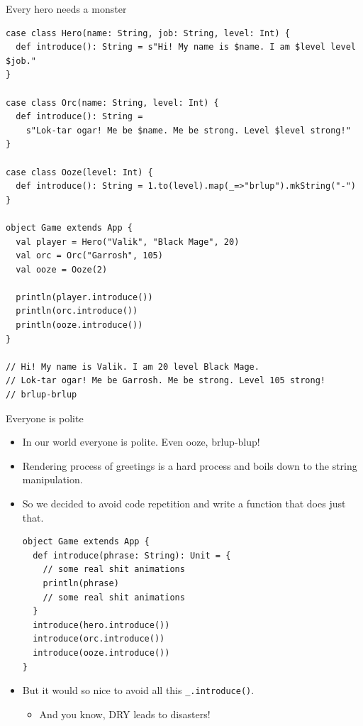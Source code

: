 \documentclass[presentation,aspectratio=169,smaller]{beamer}
\begin{document}
\begin{frame}[label={sec:org85927e2},fragile]{Every hero needs a monster}
 \begin{verbatim}
case class Hero(name: String, job: String, level: Int) {
  def introduce(): String = s"Hi! My name is $name. I am $level level $job."
}

case class Orc(name: String, level: Int) {
  def introduce(): String =
    s"Lok-tar ogar! Me be $name. Me be strong. Level $level strong!"
}

case class Ooze(level: Int) {
  def introduce(): String = 1.to(level).map(_=>"brlup").mkString("-")
}

object Game extends App {
  val player = Hero("Valik", "Black Mage", 20)
  val orc = Orc("Garrosh", 105)
  val ooze = Ooze(2)

  println(player.introduce())
  println(orc.introduce())
  println(ooze.introduce())
}

// Hi! My name is Valik. I am 20 level Black Mage.
// Lok-tar ogar! Me be Garrosh. Me be strong. Level 105 strong!
// brlup-brlup
\end{verbatim}
\end{frame}

\begin{frame}[label={sec:orgae5c5a0},fragile]{Everyone is polite}
 \begin{itemize}
\item In our world everyone is polite. Even ooze, brlup-blup!
\item Rendering process of greetings is a hard process and boils down to the string
manipulation.
\item So we decided to avoid code repetition and write a function that does just that.

\begin{verbatim}
object Game extends App {
  def introduce(phrase: String): Unit = {
    // some real shit animations
    println(phrase)
    // some real shit animations
  }
  introduce(hero.introduce())
  introduce(orc.introduce())
  introduce(ooze.introduce())
}
\end{verbatim}

\item But it would so nice to avoid all this \texttt{\_.introduce()}.
\begin{itemize}
\item And you know, DRY leads to disasters!
\end{itemize}
\end{itemize}
\end{frame}
\end{document}
